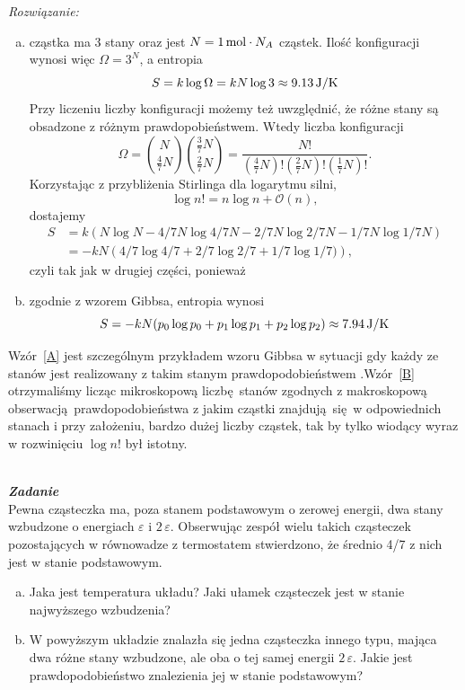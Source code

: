 \documentclass[11pt,a4paper]{article}
\newcounter{zadanie}\newcommand{\zadanie}[1][]{\addtocounter{zadanie}{1} ~\\  {\bf \emph{Zadanie \arabic{zadanie} #1 }} \\}
\begin{document}
{\em Rozwiązanie:}
\begin{enumerate}[a)]
\item cząstka ma $3$ stany oraz jest $N = 1\,{\rm mol} \cdot N_A$ cząstek. Ilość konfiguracji wynosi więc $\Omega = 3^{N}$, a entropia
\begin{equation}
	S = k \log \Omega = k N \log 3 \approx 9.13\,{\rm J/K} \label{A}
\end{equation}
Przy liczeniu liczby konfiguracji możemy też uwzględnić, że różne stany są obsadzone z różnym prawdopobieństwem. Wtedy liczba konfiguracji
\begin{equation}
	\Omega = \binom{N}{\frac{4}{7}N} \binom{\frac{3}{7}N}{\frac{2}{7}N} = \frac{N!}{(\frac{4}{7}N)! (\frac{2}{7}N)! (\frac{1}{7}N)!}.
\end{equation}
Korzystając z przybliżenia Stirlinga dla logarytmu silni,
\begin{equation}
	\log n! = n \log n + \mathcal{O}(n),
\end{equation}
dostajemy
\begin{align}
	S &= k \left(N \log N - 4/7 N \log 4/7 N - 2/7 N \log 2/7 N - 1/7 N \log 1/7 N\right) \nonumber \\
	&= - k N \left(4/7 \log 4/7 + 2/7 \log 2/7 + 1/7 \log 1/7)\right), \label{B}
\end{align}
czyli tak jak w drugiej części, ponieważ

\item zgodnie z wzorem Gibbsa, entropia wynosi
\begin{equation}
	S = - k N (p_0 \log p_0 + p_1 \log p_1 + p_2 \log p_2) \approx 7.94\,{\rm J/K}
\end{equation}
\end{enumerate}
Wzór~\eqref{A} jest szczególnym przykładem wzoru Gibbsa w sytuacji gdy każdy ze stanów jest realizowany z takim stanym prawdopodobieństwem .Wzór~\eqref{B} otrzymaliśmy licząc mikroskopową liczbę stanów zgodnych z makroskopową obserwacją prawdopodobieństwa z jakim cząstki znajdują się w odpowiednich stanach i przy założeniu, bardzo dużej liczby cząstek, tak by tylko wiodący wyraz w rozwinięciu $\log n!$ był istotny.

\newpage


\zadanie
Pewna cząsteczka ma, poza stanem podstawowym o zerowej energii, dwa stany wzbudzone o energiach $\varepsilon$ i $2\,\varepsilon$.
Obserwując zespół wielu takich cząsteczek pozostających w równowadze z 
termostatem stwierdzono, że średnio 4/7 z nich jest w stanie podstawowym.
\begin{enumerate}[a)]
\item Jaka jest temperatura układu? 
      Jaki ułamek cząsteczek jest w stanie najwyższego wzbudzenia?
\item W powyższym układzie znalazła się jedna cząsteczka innego typu, 
      mająca dwa różne stany wzbudzone, ale oba o tej samej energii $2\,\varepsilon$. 
      Jakie jest prawdopodobieństwo znalezienia jej w stanie podstawowym?
\end{enumerate}
\end{document}
